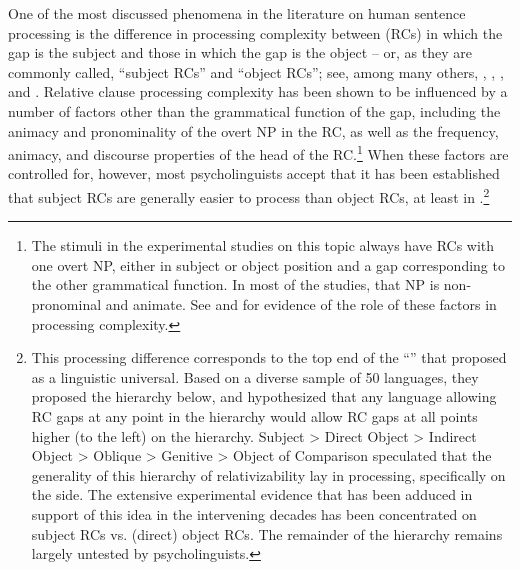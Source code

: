 \documentclass[output=paper
	        ,collection
	        ,collectionchapter
 	        ,biblatex
                ,babelshorthands
                ,newtxmath
                ,draftmode
                ,colorlinks, citecolor=brown
]{langscibook}
\begin{document}
One of the most discussed phenomena in the literature on human sentence processing is the difference in processing complexity between  (RCs) in which the gap is the subject and those in which the gap is the object -- or, as they are commonly called, ``subject RCs'' and ``object RCs''; see, among many others, \citet{WannerMaratsos78}, \citet{Gibson98a}, \citet{TraxlerEtal2002}, and \citet{GennariMacDonald2008}.  Relative clause processing complexity has been shown to be influenced by a number of factors other than the grammatical function of the gap, including the animacy and pronominality of the overt NP in the RC, as well as the frequency, animacy, and discourse properties of the head of the RC.\footnote{The stimuli in the experimental studies on this topic always have RCs with one overt NP, either in subject or object position and a gap corresponding to the other grammatical function. In most of the studies, that NP is non-pronominal and animate.  See \citet{RealiChristiansen07} and \citet{RolandEtal2012} for evidence of the role of these factors in processing complexity.} When these factors are controlled for, however, most psycholinguists accept that it has been established that subject RCs are generally easier to process than object RCs, at least in .\footnote{This processing difference corresponds to the top end of the ``'' that \citet{KC77a} proposed as a linguistic universal. Based on a diverse sample of 50 languages, they proposed the hierarchy below, and hypothesized that any language allowing RC gaps at any point in the hierarchy would allow RC gaps at all points higher (to the left) on the hierarchy.
\ea
Subject 
> 
Direct Object 
> 
Indirect Object 
> 
Oblique 
> 
Genitive
> 
Object of Comparison
\z
\citeauthor{KC77a} speculated that the generality of this hierarchy of relativizability lay in processing, specifically on the  side.  The extensive experimental evidence that has been adduced in support of this idea in the intervening decades has been concentrated on subject RCs vs. (direct) object RCs.  The remainder of the hierarchy remains largely untested by psycholinguists.}
\end{document}
